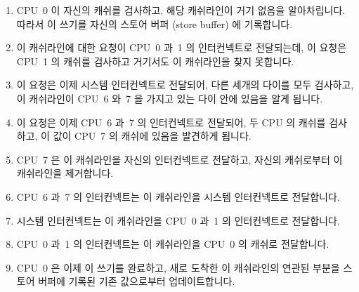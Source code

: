 \begin{enumerate}
\item	CPU~0 이 자신의 캐쉬를 검사하고, 해당 캐쉬라인이 거기 없음을
	알아차립니다.
	따라서 이 쓰기를 자신의 스토어 버퍼 (store buffer) 에 기록합니다.
\item	이 캐쉬라인에 대한 요청이 CPU~0 과~1 의 인터컨넥트로 전달되는데, 이
	요청은 CPU~1 의 캐쉬를 검사하고 거기서도 이 캐쉬라인을 찾지 못합니다.
\item	이 요청은 이제 시스템 인터컨넥트로 전달되어, 다른 세개의 다이를 모두
	검사하고, 이 캐쉬라인이 CPU~6 와~7 을 가지고 있는 다이 안에 있음을 알게
	됩니다.
\item	이 요청은 이제 CPU~6 과~7 의 인터컨넥트로 전달되어, 두 CPU 의 캐쉬를
	검사하고, 이 값이 CPU~7 의 캐쉬에 있음을 발견하게 됩니다.
\item	CPU~7 은 이 캐쉬라인을 자신의 인터컨넥트로 전달하고, 자신의 캐쉬로부터
	이 캐쉬라인을 제거합니다.
\item	CPU~6 과~7 의 인터컨넥트는 이 캐쉬라인을 시스템 인터컨넥트로
	전달합니다.
\item	시스템 인터컨넥트는 이 캐쉬라인을 CPU~0 과~1 의 인터컨넥트로
	전달합니다.
\item	CPU~0 과~1 의 인터컨넥트는 이 캐쉬라인을 CPU~0 의 캐쉬로 전달합니다.
\item	CPU~0 은 이제 이 쓰기를 완료하고, 새로 도착한 이 캐쉬라인의 연관된
	부분을 스토어 버퍼에 기록된 기존 값으로부터 업데이트합니다.

\end{enumerate}

